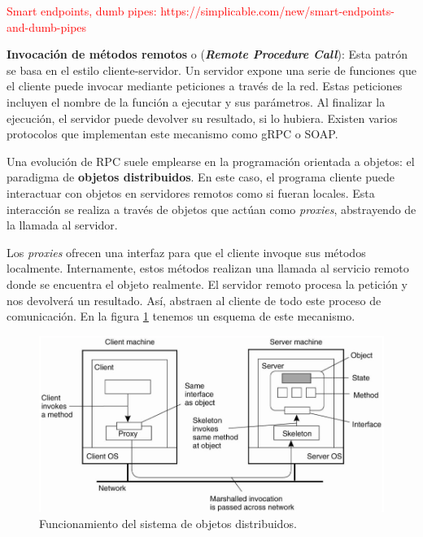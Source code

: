 \textcolor{red}{Smart endpoints, dumb pipes: https://simplicable.com/new/smart-endpoints-and-dumb-pipes}

\textbf{Invocación de métodos remotos} o (\emph{\textbf{Remote Procedure Call}}): Esta patrón se basa en el estilo cliente-servidor. Un servidor expone una serie de funciones que el cliente puede invocar mediante peticiones a través de la red. Estas peticiones incluyen el nombre de la función a ejecutar y sus parámetros. Al finalizar la ejecución, el servidor puede devolver su resultado, si lo hubiera. Existen varios protocolos que implementan este mecanismo como gRPC o SOAP.

Una evolución de RPC suele emplearse en la programación orientada a objetos: el paradigma de \textbf{objetos distribuidos}. \cite{tanenbaumChapter10Distributed2007} En este caso, el programa cliente puede interactuar con objetos en servidores remotos como si fueran locales. Esta interacción se realiza a través de objetos que actúan como \emph{proxies}, abstrayendo de la llamada al servidor.

Los \emph{proxies} ofrecen una interfaz para que el cliente invoque sus métodos localmente. Internamente, estos métodos realizan una llamada al servicio remoto donde se encuentra el objeto realmente. El servidor remoto procesa la petición y nos devolverá un resultado. Así, abstraen al cliente de todo este proceso de comunicación. En la figura \ref{fig:rpc-distributedobjects} tenemos un esquema de este mecanismo.

\begin{figure}[htb]
  \centering
  \includegraphics[scale=1.5]{03_arquitectura/images/rpc-distributedobjects}
  \caption[Funcionamiento del sistema de objetos distribuidos]{Funcionamiento del sistema de objetos distribuidos. \cite{tanenbaumChapter10Distributed2007}}
  \label{fig:rpc-distributedobjects}
\end{figure}

